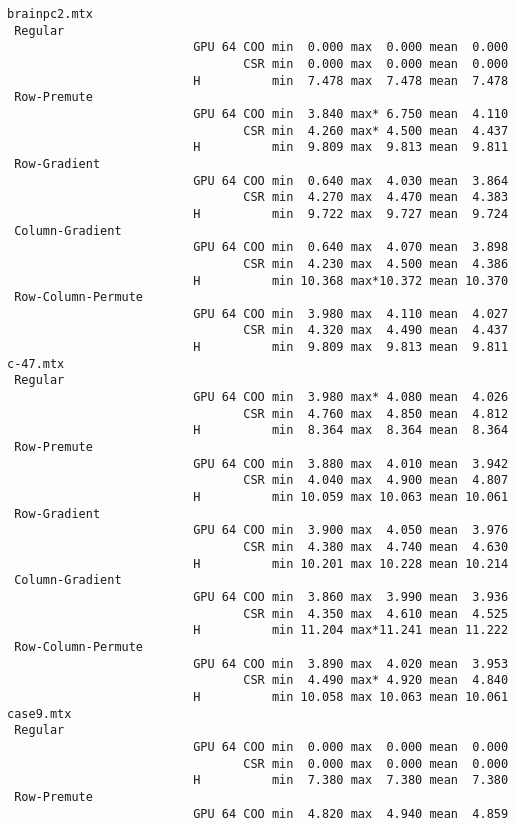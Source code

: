 {\begin{verbatim}
brainpc2.mtx
 Regular
                          GPU 64 COO min  0.000 max  0.000 mean  0.000
                                 CSR min  0.000 max  0.000 mean  0.000
                          H          min  7.478 max  7.478 mean  7.478
 Row-Premute
                          GPU 64 COO min  3.840 max* 6.750 mean  4.110
                                 CSR min  4.260 max* 4.500 mean  4.437
                          H          min  9.809 max  9.813 mean  9.811
 Row-Gradient
                          GPU 64 COO min  0.640 max  4.030 mean  3.864
                                 CSR min  4.270 max  4.470 mean  4.383
                          H          min  9.722 max  9.727 mean  9.724
 Column-Gradient
                          GPU 64 COO min  0.640 max  4.070 mean  3.898
                                 CSR min  4.230 max  4.500 mean  4.386
                          H          min 10.368 max*10.372 mean 10.370
 Row-Column-Permute
                          GPU 64 COO min  3.980 max  4.110 mean  4.027
                                 CSR min  4.320 max  4.490 mean  4.437
                          H          min  9.809 max  9.813 mean  9.811
c-47.mtx
 Regular
                          GPU 64 COO min  3.980 max* 4.080 mean  4.026
                                 CSR min  4.760 max  4.850 mean  4.812
                          H          min  8.364 max  8.364 mean  8.364
 Row-Premute
                          GPU 64 COO min  3.880 max  4.010 mean  3.942
                                 CSR min  4.040 max  4.900 mean  4.807
                          H          min 10.059 max 10.063 mean 10.061
 Row-Gradient
                          GPU 64 COO min  3.900 max  4.050 mean  3.976
                                 CSR min  4.380 max  4.740 mean  4.630
                          H          min 10.201 max 10.228 mean 10.214
 Column-Gradient
                          GPU 64 COO min  3.860 max  3.990 mean  3.936
                                 CSR min  4.350 max  4.610 mean  4.525
                          H          min 11.204 max*11.241 mean 11.222
 Row-Column-Permute
                          GPU 64 COO min  3.890 max  4.020 mean  3.953
                                 CSR min  4.490 max* 4.920 mean  4.840
                          H          min 10.058 max 10.063 mean 10.061
case9.mtx
 Regular
                          GPU 64 COO min  0.000 max  0.000 mean  0.000
                                 CSR min  0.000 max  0.000 mean  0.000
                          H          min  7.380 max  7.380 mean  7.380
 Row-Premute
                          GPU 64 COO min  4.820 max  4.940 mean  4.859

\end{verbatim}}

